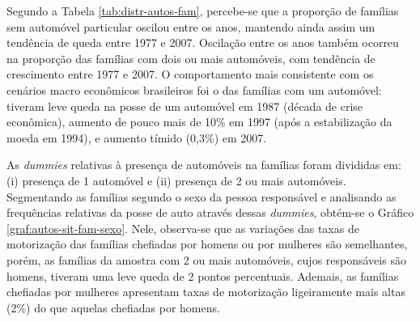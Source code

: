 Segundo a Tabela \ref{tab:distr-autos-fam}, percebe-se que a proporção de famílias sem automóvel particular oscilou entre os anos, mantendo ainda assim um tendência de queda entre 1977 e 2007. Oscilação entre os anos também ocorreu na proporção das famílias com dois ou mais automóveis, com tendência de crescimento entre 1977 e 2007. O comportamento mais consistente com os cenários macro econômicos brasileiros foi o das famílias com um automóvel: tiveram leve queda na posse de um automóvel em 1987 (década de crise econômica), aumento de pouco mais de 10\% em 1997 (após a estabilização da moeda em 1994), e aumento tímido (0,3\%) em 2007.

As \textit{dummies} relativas à presença de automóveis na famílias foram divididas em: (i) presença de 1 automóvel e (ii) presença de 2 ou mais automóveis.
Segmentando as famílias segundo o sexo da pessoa responsável e analisando as frequências relativas da posse de auto através dessas \textit{dummies}, obtém-se o Gráfico \ref{graf:autos-sit-fam-sexo}. Nele, observa-se que as variações das taxas de motorização das famílias chefiadas por homens ou por mulheres são semelhantes, porém, as famílias da amostra com 2 ou mais automóveis, cujos responsáveis são homens, tiveram uma leve queda de 2 pontos percentuais.
Ademais, as famílias chefiadas por mulheres apresentam taxas de motorização ligeiramente mais altas (2\%) do que aquelas chefiadas por homens.
  
\begin{table}[htb]

\end{table}

